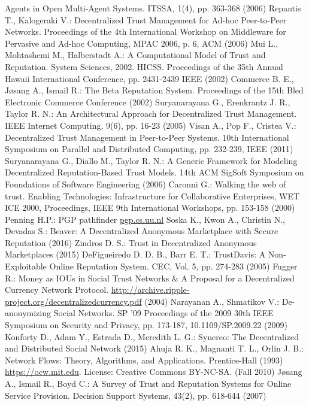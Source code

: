 \begin{thebibliography}{40}
  Agents in Open Multi-Agent Systems. ITSSA, 1(4), pp. 363-368 (2006)
  Repantis T., Kalogeraki V.: Decentralized Trust Management for Ad-hoc Peer-to-Peer Networks. Proceedings of the 4th
  International Workshop on Middleware for Pervasive and Ad-hoc Computing, MPAC 2006, p. 6, ACM (2006)
  Mui L., Mohtashemi M., Halberstadt A.: A Computational Model of Trust and Reputation. System Sciences, 2002. HICSS.
  Proceedings of the 35th Annual Hawaii International Conference, pp. 2431-2439 IEEE (2002)
  Commerce B. E., J\o{}sang A., Ismail R.: The Beta Reputation System. Proceedings of the 15th Bled Electronic Commerce
  Conference (2002)
  Suryanarayana G., Erenkrantz J. R., Taylor R. N.: An Architectural Approach for Decentralized Trust Management. IEEE
  Internet Computing, 9(6), pp. 16-23 (2005)
  Visan A., Pop F., Cristea V.: Decentralized Trust Management in Peer-to-Peer Systems. 10th International Symposium on
  Parallel and Distributed Computing, pp. 232-239, IEEE (2011)
  Suryanarayana G., Diallo M., Taylor R. N.: A Generic Framework for Modeling Decentralized Reputation-Based Trust Models.
  14th ACM SigSoft Symposium on Foundations of Software Engineering (2006)
  Caronni G.: Walking the web of trust. Enabling Technologies: Infrastructure for Collaborative Enterprises, WET ICE 2000,
  Proceedings, IEEE 9th International Workshops, pp. 153-158 (2000)
  Penning H.P.: PGP pathfinder \url{pgp.cs.uu.nl}
  Soska K., Kwon A., Christin N., Devadas S.: Beaver: A Decentralized Anonymous Marketplace with Secure Reputation (2016)
  Zindros D. S.: Trust in Decentralized Anonymous Marketplaces (2015)
  DeFigueiredo D. D. B., Barr E. T.: TrustDavis: A Non-Exploitable Online Reputation System. CEC, Vol. 5, pp. 274-283
  (2005)
  Fugger R.: Money as IOUs in Social Trust Networks \& A Proposal for a Decentralized Currency Network Protocol.
  \url{http://archive.ripple-project.org/decentralizedcurrency.pdf} (2004)
  Narayanan A., Shmatikov V.: De-anonymizing Social Networks. SP '09 Proceedings of the 2009 30th IEEE Symposium on
  Security and Privacy, pp. 173-187, 10.1109/SP.2009.22 (2009)
  Konforty D., Adam Y., Estrada D., Meredith L. G.: Synereo: The Decentralized and Distributed Social Network (2015)
  Ahuja R. K., Magnanti T. L., Orlin J. B.: Network Flows: Theory, Algorithms, and Applications. Prentice-Hall (1993)
  \url{https://ocw.mit.edu}. License: Creative Commons BY-NC-SA. (Fall 2010)
  J\o{}sang A., Ismail R., Boyd C.: A Survey of Trust and Reputation Systems for Online Service Provision. Decision
  Support Systems, 43(2), pp. 618-644 (2007)
\end{thebibliography}

